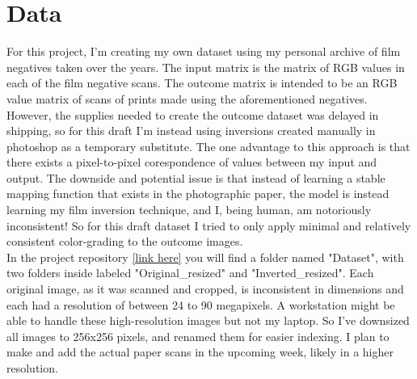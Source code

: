 \documentclass[twoside,11pt]{article}
\begin{document}
\section{Data}
\label{sec:data}
For this project, I'm creating my own dataset using my personal archive of film negatives taken over the years.
The input matrix is the matrix of RGB values in each of the film negative scans. The outcome matrix is intended to be an RGB value matrix 
of scans of prints made using the aforementioned negatives. However, the supplies needed to create the outcome dataset was delayed in shipping, 
so for this draft I'm instead using inversions created manually in photoshop as a temporary substitute. The one advantage to this approach is that there exists a 
pixel-to-pixel corespondence of values between my input and output. The downside and potential issue is that instead of learning a stable mapping function that exists 
in the photographic paper, the model is instead learning my film inversion technique, and I, being human, am notoriously inconsistent! So for this draft dataset I tried to only apply minimal 
and relatively consistent color-grading to the outcome images.\\

In the project repository \href{https://github.com/kg9903/CS374Project}{[link here]}  you will find a folder named "Dataset", with two folders inside labeled "Original\_resized" and "Inverted\_resized". 
Each original image, as it was scanned and cropped, is inconsistent in dimensions and each had a resolution of between 24 to 90 megapixels. 
A workstation might be able to handle these high-resolution images but not my laptop. So I've downsized all images to 256x256 pixels, 
and renamed them for easier indexing. I plan to make and add the actual paper scans in the upcoming week, likely in a higher resolution.
\end{document}
